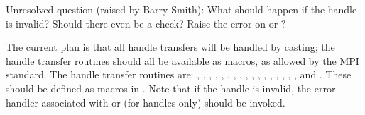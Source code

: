 \documentclass{article}
\begin{document}
Unresolved question (raised by Barry Smith):  What should happen if
the handle is invalid?  Should there even be a check?  Raise the error
on  or ?

The current plan is that all handle transfers will be handled by casting;
the handle transfer routines should all be available as macros, as allowed by
the MPI standard.  The handle transfer routines are:
,
,
,
,
,
,
,
,
,
,
,
,
,
,
,
,
, and
.
These should be defined as macros in .  Note that if the handle is
invalid, the error handler associated with  or
 (for  handles only) should be invoked.
\end{document}
